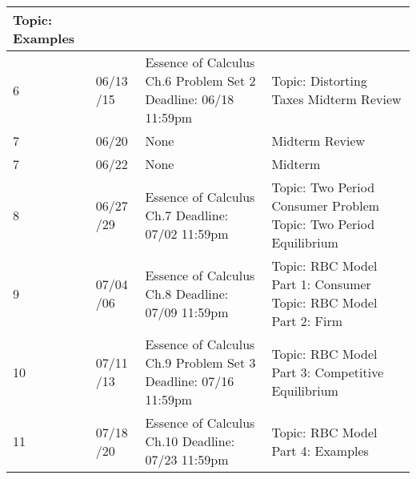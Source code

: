 \documentclass[12pt]{article}
\begin{document}
\begin{tabular}{|p{\bb}|p{\qq}|p{\rr}|p{\pp}|}
        \newline
        Topic: Examples
    \\
    \hline
        6
        &
        06/13
        \newline
        06/15
        &
        Essence of Calculus Ch.6
        \newline
        Problem Set 2
        \newline
        Deadline: 06/18 11:59pm
        &
        Topic: Distorting Taxes
        \newline
        Midterm Review
    \\
    \hline
        7
        &
        06/20
        &
        None
        &
        Midterm Review
    \\
    \hline
        7
        &
        06/22
        &
        None
        &
        Midterm
    \\
    \hline
        8
        &
        06/27
        \newline
        06/29
        &
        Essence of Calculus Ch.7
        \newline
        Deadline: 07/02 11:59pm
        &
        Topic: Two Period Consumer Problem
        \newline
        Topic: Two Period Equilibrium
    \\
    \hline
        9
        &
        07/04
        \newline
        07/06
        &
        Essence of Calculus Ch.8
        \newline
        Deadline: 07/09 11:59pm
        &
        Topic: RBC Model Part 1: Consumer
        \newline
        Topic: RBC Model Part 2: Firm
    \\
    \hline
        10
        &
        07/11
        \newline
        07/13
        &
        Essence of Calculus Ch.9
        \newline
        Problem Set 3
        \newline
        Deadline: 07/16 11:59pm
        &
        Topic: RBC Model Part 3: Competitive Equilibrium
    \\
    \hline
        11
        &
        07/18
        \newline
        07/20
        &
        Essence of Calculus Ch.10
        \newline
        Deadline: 07/23 11:59pm
        &
        Topic: RBC Model Part 4: Examples
    \\
    \hline

\end{tabular}
\end{document}

